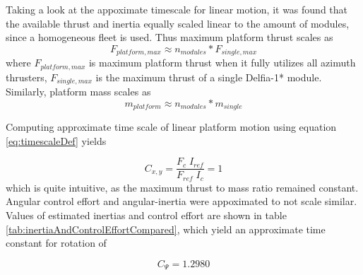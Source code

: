 Taking a look at the appoximate timescale for linear motion, it was found that the available thrust and inertia equally scaled linear to the amount of modules, since a homogeneous fleet is used. Thus maximum platform thrust scales as
\begin{equation}
	F_{platform,max} \approx n_{modules} * F_{single,max} 
\end{equation}
where $F_{platform,max}$ is maximum platform thrust when it fully utilizes all azimuth thrusters, $F_{single,max}$ is the maximum thrust of a single Delfia-1* module. Similarly, platform mass scales as
\begin{equation}
	m_{platform} \approx n_{modules} * m_{single} 
\end{equation}

Computing approximate time scale of linear platform motion using equation \ref{eq:timescaleDef} yields

\begin{equation}
C_{x,y} = \frac{F_{c} \; I_{ref}}{F_{ref} \; I_{c}} = 1
\label{eq:timescaleDef2}
\end{equation}
which is quite intuitive, as the maximum thrust to mass ratio remained constant.  Angular control effort and angular-inertia were appoximated to not scale similar. Values of estimated inertias and control effort are shown in table \ref{tab:inertiaAndControlEffortCompared}, which yield an approximate time constant for rotation of 

\begin{equation}
C_{\Psi}  = 1.2980
\label{eq:timescaleDefYaw}
\end{equation}
 


